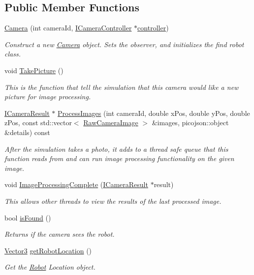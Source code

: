 \subsection*{Public Member Functions}
\begin{DoxyCompactItemize}
\item 
\hyperlink{classCamera_a94c943c9dbc0d75340f34d3816eec8fc}{Camera} (int camera\+Id, \hyperlink{classICameraController}{I\+Camera\+Controller} $\ast$\hyperlink{classCamera_aca1a708bb6132877f6be0b62cfe2c834}{controller})
\begin{DoxyCompactList}\small\item\em Construct a new \hyperlink{classCamera}{Camera} object. Sets the observer, and initializes the find robot class. \end{DoxyCompactList}\item 
\mbox{\label{classCamera_a70dfc7f06d6e12855afadd358831cf3a}} 
void \hyperlink{classCamera_a70dfc7f06d6e12855afadd358831cf3a}{Take\+Picture} ()
\begin{DoxyCompactList}\small\item\em This is the function that tell the simulation that this camera would like a new picture for image processing. \end{DoxyCompactList}\item 
\hyperlink{classICameraResult}{I\+Camera\+Result} $\ast$ \hyperlink{classCamera_a792611ad34a1c595b61b7c72ce1d5e32}{Process\+Images} (int camera\+Id, double x\+Pos, double y\+Pos, double z\+Pos, const std\+::vector$<$ \hyperlink{structRawCameraImage}{Raw\+Camera\+Image} $>$ \&images, picojson\+::object \&details) const
\begin{DoxyCompactList}\small\item\em After the simulation takes a photo, it adds to a thread safe queue that this function reads from and can run image processing functionality on the given image. \end{DoxyCompactList}\item 
void \hyperlink{classCamera_a28c3836707bdaf6e1a2098ec20460995}{Image\+Processing\+Complete} (\hyperlink{classICameraResult}{I\+Camera\+Result} $\ast$result)
\begin{DoxyCompactList}\small\item\em This allows other threads to view the results of the last processed image. \end{DoxyCompactList}\item 
bool \hyperlink{classCamera_a7a88bbfa9d8529f4351f5a7396d5e80b}{is\+Found} ()
\begin{DoxyCompactList}\small\item\em Returns if the camera sees the robot. \end{DoxyCompactList}\item 
\hyperlink{classVector3}{Vector3} \hyperlink{classCamera_a23e1dc349268eafe666b83d0a3b831a2}{get\+Robot\+Location} ()
\begin{DoxyCompactList}\small\item\em Get the \hyperlink{classRobot}{Robot} Location object. \end{DoxyCompactList}\end{DoxyCompactItemize}
